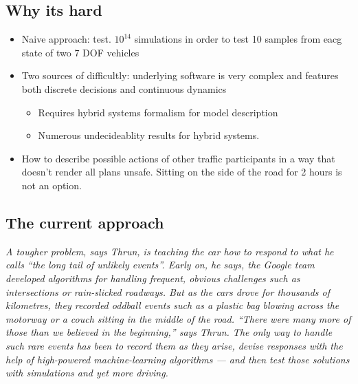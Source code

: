  \subsection{Why its hard}
 \begin{itemize}
 	\item Naive approach: test. $10^{14}$ simulations in order to test 10 samples from eacg state of two 7 DOF vehicles 
 	\item Two sources of difficultly: underlying software is very complex and features both discrete decisions and continuous dynamics
 	\begin{itemize}
 		\item Requires hybrid systems formalism for model description
 		\item Numerous undecideablity results for hybrid systems.
 	\end{itemize}
 	\item How to describe possible actions of other traffic participants in a way that doesn't render all plans unsafe. Sitting on the side of the road for 2 hours is not an option. 
 \end{itemize}
 
 \subsection{The current approach}
\emph{A tougher problem, says Thrun, is teaching the car how to respond to what he calls “the long tail of unlikely events”. Early on, he says, the Google team developed algorithms for handling frequent, obvious challenges such as intersections or rain-slicked roadways. But as the cars drove for thousands of kilometres, they recorded oddball events such as a plastic bag blowing across the motorway or a couch sitting in the middle of the road. “There were many more of those than we believed in the beginning,” says Thrun. The only way to handle such rare events has been to record them as they arise, devise responses with the help of high-powered machine-learning algorithms — and then test those solutions with simulations and yet more driving.
} 

